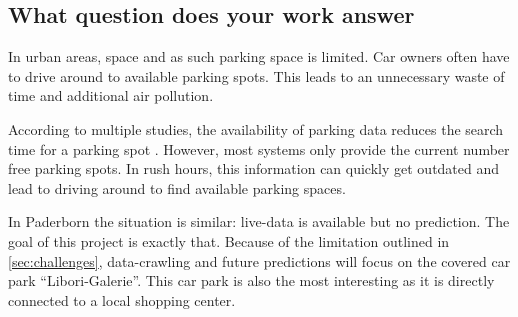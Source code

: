 \subsection{What question does your work answer}
In urban areas, space and as such parking space is limited. Car owners often have to drive around to available parking spots. This leads to an unnecessary waste of time and additional air pollution. 

According to multiple studies, the availability of parking data reduces the search time for a parking spot \cite{Asakura1994}\cite{Caicedo2010228}. However, most systems only provide the current number free parking spots. In rush hours, this information can quickly get outdated and lead to driving around to find available parking spaces.

In Paderborn the situation is similar: live-data is available but no prediction. The goal of this project is exactly that. Because of the limitation outlined in \ref{sec:challenges}, data-crawling and future predictions will focus on the covered car park ``Libori-Galerie''. This car park is also the most interesting as it is directly connected to a local shopping center. 


